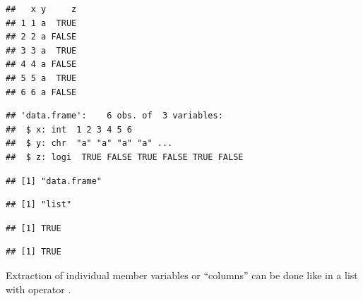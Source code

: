 \documentclass[krantz2]{krantz}\usepackage{knitr}
\begin{document}
\begin{knitrout}\footnotesize
{}\color{fgcolor}\begin{kframe}
\begin{alltt}
 \hlkwb{<-} \hlstd{(} \hlstd{=} \hlopt{:}\hlstd{,}  \hlstd{=} \hlstd{,}  \hlstd{=} \hlstd{(}\hlstd{,} \hlstd{))}
\end{alltt}
\begin{verbatim}
##   x y     z
## 1 1 a  TRUE
## 2 2 a FALSE
## 3 3 a  TRUE
## 4 4 a FALSE
## 5 5 a  TRUE
## 6 6 a FALSE
\end{verbatim}
\begin{alltt}
\end{alltt}
\begin{verbatim}
## 'data.frame':	6 obs. of  3 variables:
##  $ x: int  1 2 3 4 5 6
##  $ y: chr  "a" "a" "a" "a" ...
##  $ z: logi  TRUE FALSE TRUE FALSE TRUE FALSE
\end{verbatim}
\begin{alltt}
\end{alltt}
\begin{verbatim}
## [1] "data.frame"
\end{verbatim}
\begin{alltt}
\end{alltt}
\begin{verbatim}
## [1] "list"
\end{verbatim}
\begin{alltt}
\end{alltt}
\begin{verbatim}
## [1] TRUE
\end{verbatim}
\begin{alltt}
\end{alltt}
\begin{verbatim}
## [1] TRUE
\end{verbatim}
\end{kframe}
\end{knitrout}

Extraction of individual member variables or ``columns'' can be done like in a list with operator \Roperator{[[ ]]}.
\end{document}
